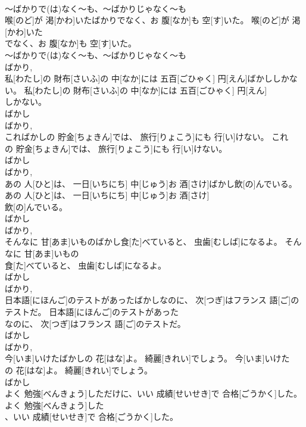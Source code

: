 \documentclass[8pt]{extreport}
\begin{document}
\begin{CJK}{UTF8}{min}
\\	～ばかりで(は)なく～も、～ばかりじゃなく～も
\\	喉[のど]が 渇[かわ]いたばかりでなく、お 腹[なか]も 空[す]いた。	喉[のど]が 渇[かわ]いた
\\	でなく、お 腹[なか]も 空[す]いた。	
\\	～ばかりで(は)なく～も、～ばかりじゃなく～も
\\	ばかり, 
\\	私[わたし]の 財布[さいふ]の 中[なか]には 五百[ごひゃく] 円[えん]ばかししかない。	私[わたし]の 財布[さいふ]の 中[なか]には 五百[ごひゃく] 円[えん]
\\	しかない。	
\\	ばかし 
\\	ばかり, 
\\	こればかしの 貯金[ちょきん]では、 旅行[りょこう]にも 行[い]けない。	これ
\\	の 貯金[ちょきん]では、 旅行[りょこう]にも 行[い]けない。	
\\	ばかし 
\\	ばかり, 
\\	あの 人[ひと]は、 一日[いちにち] 中[じゅう]お 酒[さけ]ばかし飲[の]んでいる。	あの 人[ひと]は、 一日[いちにち] 中[じゅう]お 酒[さけ]
\\	飲[の]んでいる。	
\\	ばかし 
\\	ばかり, 
\\	そんなに 甘[あま]いものばかし食[た]べていると、 虫歯[むしば]になるよ。	そんなに 甘[あま]いもの
\\	食[た]べていると、 虫歯[むしば]になるよ。	
\\	ばかし 
\\	ばかり, 
\\	日本語[にほんご]のテストがあったばかしなのに、 次[つぎ]はフランス 語[ご]のテストだ。	日本語[にほんご]のテストがあった
\\	なのに、 次[つぎ]はフランス 語[ご]のテストだ。	
\\	ばかし 
\\	ばかり, 
\\	今[いま]いけたばかしの 花[はな]よ。 綺麗[きれい]でしょう。	今[いま]いけた
\\	の 花[はな]よ。 綺麗[きれい]でしょう。	
\\	ばかし 
\\	よく 勉強[べんきょう]しただけに、いい 成績[せいせき]で 合格[ごうかく]した。	よく 勉強[べんきょう]した
\\	、いい 成績[せいせき]で 合格[ごうかく]した。	

\end{CJK}
\end{document}
